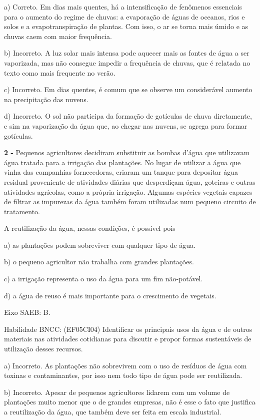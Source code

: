 a) Correto. Em dias mais quentes, há a intensificação de fenômenos
essenciais para o aumento do regime de chuvas: a evaporação de águas de
oceanos, rios e solos e a evapotranspiração de plantas. Com isso, o ar
se torna mais úmido e as chuvas caem com maior frequência.

b) Incorreto. A luz solar mais intensa pode aquecer mais as fontes de
água a ser vaporizada, mas não consegue impedir a frequência de chuvas,
que é relatada no texto como mais frequente no verão.

c) Incorreto. Em dias quentes, é comum que se observe um considerável
aumento na precipitação das nuvens.

d) Incorreto. O sol não participa da formação de gotículas de chuva
diretamente, e sim na vaporização da água que, ao chegar nas nuvens, se
agrega para formar gotículas.

\textbf{2 -} Pequenos agricultores decidiram substituir as bombas d'água
que utilizavam água tratada para a irrigação das plantações. No lugar de
utilizar a água que vinha das companhias fornecedoras, criaram um tanque
para depositar água residual proveniente de atividades diárias que
desperdiçam água, goteiras e outras atividades agrícolas, como a própria
irrigação. Algumas espécies vegetais capazes de filtrar as impurezas da
água também foram utilizadas num pequeno circuito de tratamento.

A reutilização da água, nessas condições, é possível pois

a) as plantações podem sobreviver com qualquer tipo de água.

b) o pequeno agricultor não trabalha com grandes plantações.

c) a irrigação representa o uso da água para um fim não-potável.

d) a água de reuso é mais importante para o crescimento de vegetais.

Eixo SAEB: B.

Habilidade BNCC: (EF05CI04) Identificar os principais usos da água e de
outros materiais nas atividades cotidianas para discutir e propor formas
sustentáveis de utilização desses recursos.

a) Incorreto. As plantações não sobrevivem com o uso de resíduos de água
com toxinas e contaminantes, por isso nem todo tipo de água pode ser
reutilizada.

b) Incorreto. Apesar de pequenos agricultores lidarem com um volume de
plantações muito menor que o de grandes empresas, não é esse o fato que
justifica a reutilização da água, que também deve ser feita em escala
industrial.

